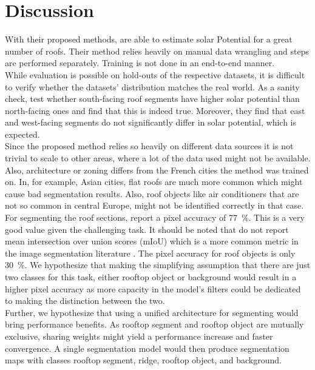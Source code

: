 \documentclass{article} %
\begin{document}
\section*{Discussion}
With their proposed methods, \citet{de2021predicting} are able to estimate solar Potential for a great number of roofs. Their method relies heavily on manual data wrangling and steps are performed separately. Training is not done in an end-to-end manner.\\
While evaluation is possible on hold-outs of the respective datasets, it is difficult to verify whether the datasets' distribution matches the real world. As a sanity check, \citet{de2021predicting} test whether south-facing roof segments have higher solar potential than north-facing ones and find that this is indeed true. Moreover, they find that east and west-facing segments do not significantly differ in solar potential, which is expected.\\
Since the proposed method relies so heavily on different data sources it is not trivial to scale to other areas, where a lot of the data used might not be available. Also, architecture or zoning differs from the French cities the method was trained on. In, for example, Asian cities, flat roofs are much more common which might cause bad segmentation results. Also, roof objects like air conditioners that are not so common in central Europe, might not be identified correctly in that case.\\
For segmenting the roof sections, \citet{de2021predicting} report a pixel accuracy of \SI{77}{\percent}. This is a very good value given the challenging task. It should be noted that \citet{de2021predicting} do not report mean intersection over union scores (mIoU) which is a more common metric in the image segmentation literature \cite{minaee2021image}. The pixel accuracy for roof objects is only \SI{30}{\percent}. We hypothesize that making the simplifying assumption that there are just two classes for this task, either rooftop object or background would result in a higher pixel accuracy as more capacity in the model's filters could be dedicated to making the distinction between the two.\\
Further, we hypothesize that using a unified architecture for segmenting would bring performance benefits. As rooftop segment and rooftop object are mutually exclusive, sharing weights might yield a performance increase and faster convergence. A single segmentation model would then produce segmentation maps with classes rooftop segment, ridge, rooftop object, and background.\\
\end{document}
